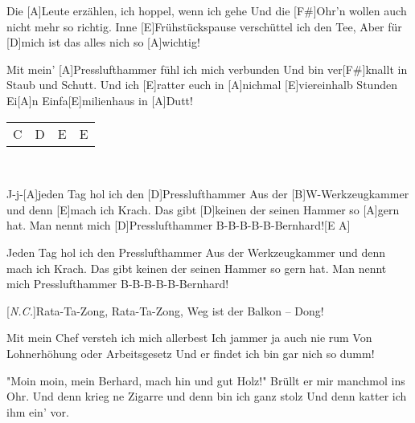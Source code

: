 
\hspace{\fill}

\begin{guitar}
	Die [A]Leute erzählen, ich hoppel, wenn ich gehe
	Und die [F#]Ohr'n wollen auch nicht mehr so richtig.
	Inne [E]Frühstückspause verschüttel ich den Tee,
	Aber für [D]mich ist das alles nich so [A]wichtig!
	
	Mit mein' [A]Presslufthammer fühl ich mich verbunden
	Und bin ver[F#]knallt in Staub und Schutt.
	Und ich [E]ratter euch in [A]nichmal [E]viereinhalb Stunden
	Ei[A]n Einfa[E]milienhaus in [A]Dutt!
	
	 {\footnotesize\begin{tabular}{|l|l|l|l|}
			C & D & E & E 
	\end{tabular}}
	\vspace{-3.375em} \\ \hfill {}  \vspace{-0.125em}
	\begin{highlightbar}
		J-j-[A]jeden Tag hol ich den [D]Presslufthammer
		Aus der [B]W-Werkzeugkammer und denn [E]mach ich Krach.
		Das gibt [D]keinen der seinen Hammer so [A]gern hat.
		Man nennt mich [D]Presslufthammer B-B-B-B-B-Bernhard![E A]{}
		
		Jeden Tag hol ich den Presslufthammer
		Aus der Werkzeugkammer und denn mach ich Krach.
		Das gibt keinen der seinen Hammer so gern hat.
		Man nennt mich Presslufthammer B-B-B-B-B-Bernhard!
		
		[\textit{N.C.}]Rata-Ta-Zong, Rata-Ta-Zong, Weg ist der Balkon – Dong! \vspace{-0.1em}
	\end{highlightbar}
	
	Mit mein Chef versteh ich mich allerbest
	Ich jammer ja auch nie rum
	Von Lohnerhöhung oder Arbeitsgesetz
	Und er findet ich bin gar nich so dumm!
	
	"Moin moin, mein Berhard, mach hin und gut Holz!"
	Brüllt er mir manchmol ins Ohr.
	Und denn krieg ne Zigarre und denn bin ich ganz stolz
	Und denn katter ich ihm ein' vor.
	

\end{guitar}
